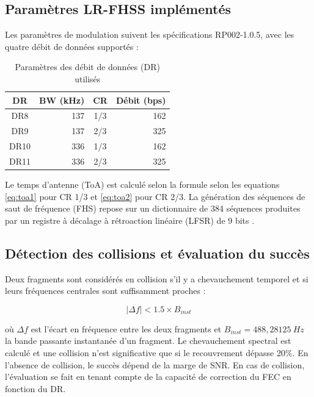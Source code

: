 \subsection{Paramètres LR-FHSS implémentés}

Les paramètres de modulation suivent les spécifications RP002-1.0.5, avec les quatre débit de données supportés :

\begin{center}
	\begin{table}[H]
		\caption{Paramètres des débit de données (DR) utilisés}
		\centering
		\begin{tabular}{|c|r|c|r|}
			\hline
			\textbf{DR} & \textbf{BW (kHz)} & \textbf{CR} & \textbf{Débit (bps)} \\
			\hline
			DR8  & 137 & 1/3 & 162 \\
			DR9  & 137 & 2/3 & 325 \\
			DR10 & 336  & 1/3 & 162 \\
			DR11 & 336  & 2/3 & 325 \\
			\hline
		\end{tabular}
	\end{table}
\end{center}

Le temps d'antenne (ToA) est calculé selon la formule selon les equations \ref{eq:toa1} pour CR 1/3 et \ref{eq:toa2} pour CR 2/3.
La génération des séquences de saut de fréquence (FHS) repose sur un dictionnaire de 384 séquences produites par un registre à décalage à rétroaction linéaire (LFSR) de 9 bits \cite{lfsr}.

\subsection{Détection des collisions et évaluation du succès}

Deux fragments sont considérés en collision s'il y a chevauchement temporel et si leurs fréquences centrales sont suffisamment proches :

\begin{equation}
	|\Delta f| < 1.5 \times B_{inst}
	\label{eq:collision_freq}
\end{equation}

où \(\Delta f\) est l'écart en fréquence entre les deux fragments et \(B_{inst} = 488{,}28125\ Hz\) la bande passante instantanée d'un fragment. Le chevauchement spectral est calculé et une collision n'est significative que si le recouvrement dépasse 20\%. En l'absence de collision, le succès dépend de la marge de SNR. En cas de collision, l'évaluation se fait en tenant compte de la capacité de correction du FEC en fonction du DR.

